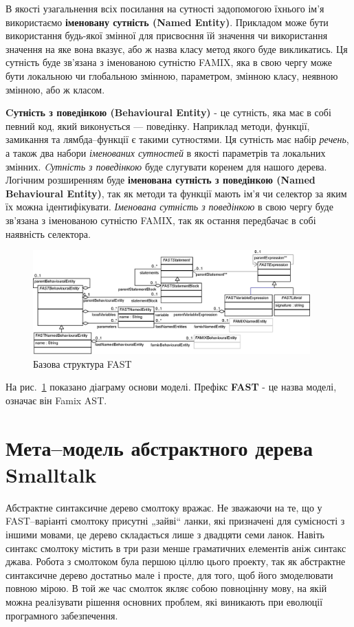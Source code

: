 \documentclass[12pt,a4paper]{article}
\begin{document}
В якості узагальнення всіх посилання на сутності задопомогою їхнього ім'я використаємо \textbf{іменовану сутність (Named Entity)}. Прикладом може бути використання будь-якої змінної для присвоєння їй значення чи використання значення на яке вона вказує, або ж назва класу метод якого буде викликатись. Ця сутність буде зв'язана з іменованою сутністю FAMIX, яка в свою чергу може бути локальною чи глобальною змінною, параметром, змінною класу, неявною змінною, або ж класом.

\textbf{Cутність з поведінкою (Behavioural Entity)} - це сутність, яка має в собі певний код, який виконується --- поведінку. Наприклад методи, функції, замикання та лямбда--функції є такими сутностями. Ця сутність має набір \emph{речень}, а також два набори \emph{іменованих сутностей} в якості параметрів та локальних змінних. \emph{Cутність з поведінкою} буде слугувати коренем для нашого дерева. Логічним розширенням буде \textbf{іменована сутність з поведінкою (Named Behavioural Entity)}, так як методи та функції мають ім'я чи селектор за яким їх можна ідентифікувати. \emph{Іменована сутність з поведінкою} в свою чергу буде зв'язана з іменованою сутністю FAMIX, так як остання передбачає в собі наявність селектора.

\begin{figure}[h]
  \centering
    \includegraphics[width=0.95\textwidth]{GeneralASTClassDiagram}
  \caption{Базова структура FAST\label{genFast}}
\end{figure}

На рис.~\ref{genFast} показано діаграму основи моделі. Префікс \textbf{FAST} - це назва моделі, означає він Famix AST.

\clearpage

\section{Мета--модель абстрактного дерева Smalltalk}

Абстрактне синтаксичне дерево смолтоку вражає. Не зважаючи на те, що у FAST--варіанті смолтоку присутні „зайві“ ланки, які призначені для сумісності з іншими мовами, це дерево складається лише з двадцяти семи ланок. Навіть синтакс смолтоку містить в три рази менше граматичних елементів аніж синтакс джава\cite{meet-grammars}. Робота з смолтоком була першою ціллю цього проекту, так як абстрактне синтаксичне дерево достатньо мале і просте, для того, щоб його змоделювати повною мірою. В той же час смолток якляє собою повноцінну мову, на якій можна реалізувати рішення основних проблем, які виникають при еволюції програмного забезпечення.
\end{document}
